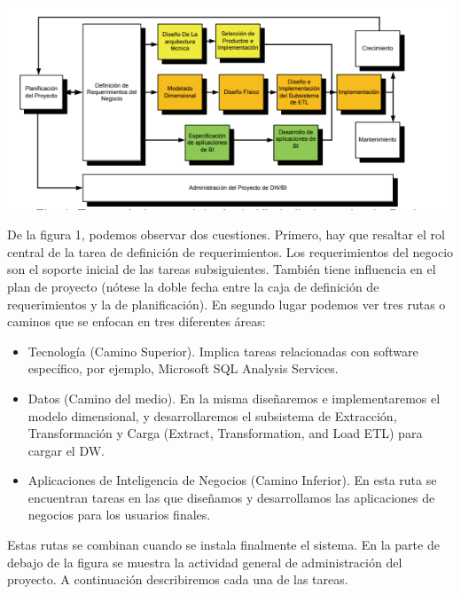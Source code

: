 \documentclass[preprint,12pt]{elsarticle}
\begin{document}
\begin{enumerate}[3.1]
\begin {center}
\includegraphics[scale= 0.80]{./Imagenes/1.png}
\end {center}

De la figura 1, podemos observar dos cuestiones. Primero, hay que resaltar el rol central de la tarea de definición de requerimientos.
Los requerimientos del negocio son el soporte inicial de las tareas subsiguientes. También tiene influencia en el plan de proyecto (nótese la doble fecha entre la caja de definición de requerimientos y la de planificación). En segundo lugar podemos ver tres rutas o caminos que se enfocan en tres diferentes áreas:\\

\begin{itemize}
  \item Tecnología (Camino Superior). Implica tareas relacionadas con software específico, por ejemplo, Microsoft SQL Analysis Services.
\\
  \item Datos (Camino del medio). En la misma diseñaremos e implementaremos el modelo dimensional, y desarrollaremos el subsistema de Extracción, Transformación y Carga (Extract, Transformation, and Load  ETL) para cargar el DW.
\\
  \item Aplicaciones de Inteligencia de Negocios (Camino Inferior). En esta ruta se encuentran tareas en las que diseñamos y desarrollamos las aplicaciones de negocios para los usuarios finales.
\\

\end{itemize} 
Estas rutas se combinan cuando se instala finalmente el sistema. En la parte de debajo de la figura se muestra la actividad general de administración del proyecto. A continuación describiremos cada una de las tareas. 
\end{enumerate}
\end{document}
